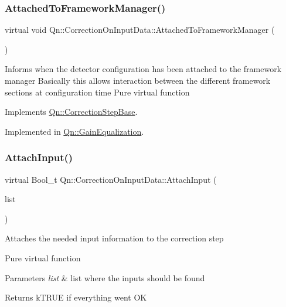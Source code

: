 \subsubsection{\texorpdfstring{Attached\+To\+Framework\+Manager()}{AttachedToFrameworkManager()}}
{\footnotesize\ttfamily virtual void Qn\+::\+Correction\+On\+Input\+Data\+::\+Attached\+To\+Framework\+Manager (\begin{DoxyParamCaption}{ }\end{DoxyParamCaption})\hspace{0.3cm}{\ttfamily [pure virtual]}}

Informs when the detector configuration has been attached to the framework manager Basically this allows interaction between the different framework sections at configuration time Pure virtual function 

Implements \mbox{\hyperlink{classQn_1_1CorrectionStepBase_a0c255ad7095cd2aa89fcf1f1db068949}{Qn\+::\+Correction\+Step\+Base}}.



Implemented in \mbox{\hyperlink{classQn_1_1GainEqualization_a487cc533ff299196a16d0ee4688d1039}{Qn\+::\+Gain\+Equalization}}.

\mbox{\label{classQn_1_1CorrectionOnInputData_a37c53966c0121ed0f7d764a9769690be}} 
\subsubsection{\texorpdfstring{Attach\+Input()}{AttachInput()}}
{\footnotesize\ttfamily virtual Bool\+\_\+t Qn\+::\+Correction\+On\+Input\+Data\+::\+Attach\+Input (\begin{DoxyParamCaption}\item[{T\+List $\ast$}]{list }\end{DoxyParamCaption})\hspace{0.3cm}{\ttfamily [pure virtual]}}

Attaches the needed input information to the correction step

Pure virtual function 
\begin{DoxyParams}{Parameters}
{\em list} & list where the inputs should be found \\
\hline
\end{DoxyParams}
\begin{DoxyReturn}{Returns}
k\+T\+R\+UE if everything went OK 
\end{DoxyReturn}


